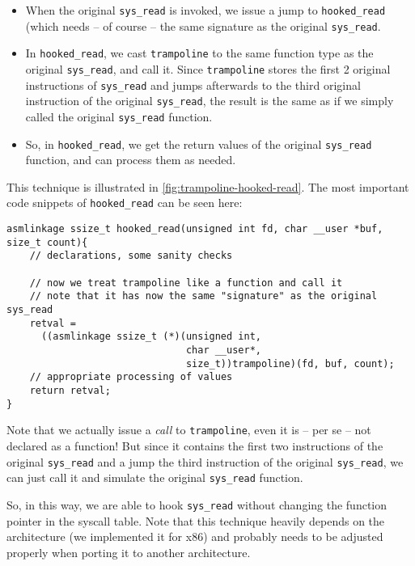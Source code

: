 \documentclass[10pt, letterpaper]{scrartcl}
\begin{document}
\begin{itemize}
\item When the original \texttt{sys\_read} is invoked, we issue a jump to \texttt{hooked\_read} (which needs -- of course -- the same signature as the original \texttt{sys\_read}.
\item In \texttt{hooked\_read}, we cast \texttt{trampoline} to the same function type as the original \texttt{sys\_read}, and call it. Since \texttt{trampoline} stores the first 2 original instructions of \texttt{sys\_read} and jumps afterwards to the third original instruction of the original \texttt{sys\_read}, the result is the same as if we simply called the original \texttt{sys\_read} function.
\item So, in \texttt{hooked\_read}, we get the return values of the original \texttt{sys\_read} function, and can process them as needed.
\end{itemize}

This technique is illustrated in \autoref{fig:trampoline-hooked-read}. The most important code snippets of \texttt{hooked\_read} can be seen here:

\begin{verbatim}
asmlinkage ssize_t hooked_read(unsigned int fd, char __user *buf, size_t count){
    // declarations, some sanity checks

    // now we treat trampoline like a function and call it
    // note that it has now the same "signature" as the original sys_read
    retval = 
      ((asmlinkage ssize_t (*)(unsigned int, 
                               char __user*,
                               size_t))trampoline)(fd, buf, count);
    // appropriate processing of values
    return retval;
}
\end{verbatim}

Note that we actually issue a \emph{call} to \texttt{trampoline}, even it is -- per se -- not declared as a function! But since it contains the first two instructions of the original \texttt{sys\_read} and a jump the third instruction of the original \texttt{sys\_read}, we can just call it and simulate the original \texttt{sys\_read} function.

So, in this way, we are able to hook \texttt{sys\_read} without changing the function pointer in the syscall table. Note that this technique heavily depends on the architecture (we implemented it for x86) and probably needs to be adjusted properly when porting it to another architecture.
\end{document}
